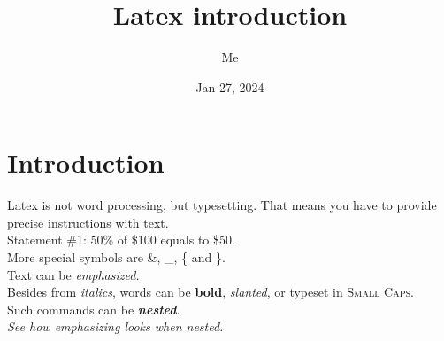 \documentclass[a4paper, 12pt]{article}
\title{Latex introduction}
\author{Me}
\date{Jan 27, 2024}
\begin{document}
\maketitle
\section{Introduction}
Latex is not word processing, but typesetting. That means you have to provide precise instructions with text.\\
Statement \#1:
50\% of \$100 equals to \$50.\\
More special symbols are \&, \_, \{ and \}.\\
Text can be \emph{emphasized.}\\
Besides from \textit{italics}, words can be \textbf{bold}, \textsl{slanted}, or typeset in \textsc{Small Caps}.\\
Such commands can be \textit{\textbf{nested}}.\\
\emph{See how \emph{emphasizing} looks when nested.}
\end{document}
